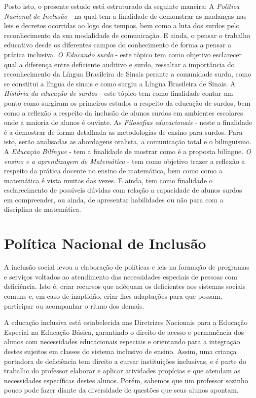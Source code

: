 \documentclass[brasil]{abnt}
\begin{document}
	Posto isto, o presente estudo está estruturado da seguinte maneira: A \textit{Política Nacional de Inclusão} - na qual tem a finalidade de demonstrar as mudanças nas leis e decretos ocorridas ao logo dos tempos, bem como a luta 
	dos surdos pelo reconhecimento da sua modalidade de comunicação. E ainda, o pensar o trabalho educativo desde os diferentes campos do conhecimento de forma a pensar a prática inclusiva. \textit{O Educando surdo} - este tópico
	tem como objetivo esclarecer qual a diferença entre deficiente auditivo e surdo, ressaltar a importância do reconhecimento da Língua Brasileira de Sinais perante a comunidade surda, como se constitui a língua de sinais e como surgiu a
	Língua Brasileira de Sinais. A \textit{História da educação de surdos} - este tópico tem como finalidade contar um ponto como surgiram os primeiros estudos a respeito da educação de surdos, bem como a reflexão a respeito da inclusão 
	de alunos surdos em ambientes escolares onde a maioria de alunos é ouvinte. As \textit{Filosofias educacionais} - neste a finalidade é a demostrar de forma detalhada as metodologias de ensino para surdos. Para isto, serão analisadas 
	as abordagens oralista, a comunicação total e o bilinguismo. A \textit{Educação Bilíngue} - tem a finalidade de mostrar como é a proposta bilíngue. \textit{O ensino e a aprendizagem de Matemática} - tem como objetivo trazer a reflexão 
	a respeito da prática docente no ensino de matemática, bem como como a matemática é vista muitas das vezes. E ainda, tem como finalidade o esclarecimento de possíveis
	dúvidas com relação a capacidade de alunos surdos em compreender, ou ainda, de apresentar habilidades ou não para com a disciplina de matemática.  

\chapter{Política Nacional de Inclusão}
	A inclusão social levou a elaboração de políticas e leis na formação de programas e serviços voltados ao atendimento das necessidades especiais de pessoas com deficiência. Isto é, criar recursos que 
	adéquam os deficientes aos sistemas sociais comuns e, em caso de inaptidão, criar-lhes adaptações para que possam, participar ou acompanhar o ritmo dos demais. 
	
	A educação inclusiva está estabelecida nas Diretrizes Nacionais para a Educação Especial na Educação Básica, garantindo o direito de acesso e permanência dos alunos com necessidades 
	educacionais especiais e orientando para a integração destes sujeitos em classes do sistema inclusivo de ensino. Assim, uma criança portadora de deficiência tem direito a cursar instituições 
	inclusivas, e é parte do trabalho do professor elaborar e aplicar atividades propícias e que atendam as necessidades específicas destes alunos. Porém, sabemos que um professor sozinho pouco pode 
	fazer diante da diversidade de questões que seus alunos apontam. 
		
\end{document}
